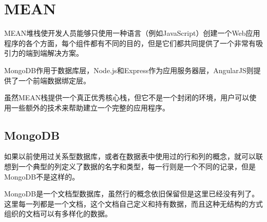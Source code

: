 \begin{lstlisting}[language=bash]

\end{lstlisting}



\begin{lstlisting}[language=bash]

\end{lstlisting}



\begin{lstlisting}[language=bash]

\end{lstlisting}




\begin{lstlisting}[language=bash]

\end{lstlisting}



\begin{lstlisting}[language=bash]

\end{lstlisting}






\chapter{MEAN}



MEAN堆栈使开发人员能够只使用一种语言（例如JavaScript）创建一个Web应用程序的各个方面，每个组件都有不同的目的，但是它们都共同提供了一个非常有吸引力的端到端解决方案。

MongoDB作用于数据库层，Node.js和Express作为应用服务器层，AngularJS则提供了一个前端数据绑定层。

虽然MEAN栈提供一个真正优秀核心栈，但它不是一个封闭的环境，用户可以使用一些额外的技术来帮助建立一个完整的应用程序。


\section{MongoDB}

如果以前使用过关系型数据库，或者在数据表中使用过的行和列的概念，就可以联想到一个典型的列定义了数据的名字和类型，每一行则是一个不同的记录，但是MongoDB不是这样的。

MongoDB是一个文档型数据库，虽然行的概念依旧保留但是这里已经没有列了。这里每一列都是一个文档，这个文档自己定义和持有数据，而且这种无结构的方式组织的文档可以有多样化的数据。

